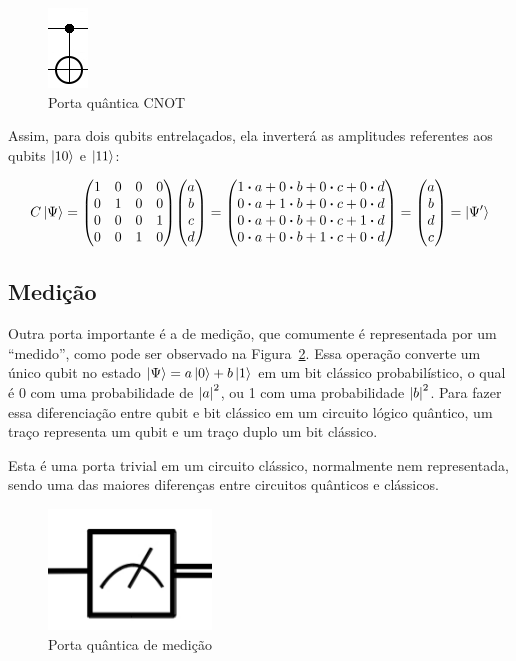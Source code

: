 \documentclass[a4paper, 12pt, oneside]{book}
\begin{document}
\begin{figure}[H]
\centering
\includegraphics[scale=0.80]{cnot.png}
\caption{Porta quântica CNOT}
\label{fig:CNOT}
\end{figure}

Assim, para dois qubits entrelaçados, ela inverterá as amplitudes referentes aos qubits $\ket{10}$ e $\ket{11}$:

\begin{equation}\label{eqFullCNOT}
C\ket{\Psi} = \mqty(1&0&0&0\\0&1&0&0\\0&0&0&1\\0&0&1&0)\mqty(a\\b\\c\\d) = 
\mqty(1 \vdot a+0 \vdot b +0 \vdot c +0 \vdot d \\
	  0 \vdot a+1 \vdot b +0 \vdot c +0 \vdot d \\
	  0 \vdot a+0 \vdot b +0 \vdot c +1 \vdot d \\
	  0 \vdot a+0 \vdot b +1 \vdot c +0 \vdot d ) 
= \mqty(a\\b\\d\\c) = \ket{\Psi'}
\end{equation}

\subsection{Medição} \label{sec:medicao}
Outra porta importante é a de medição, que comumente é representada por um ``medido'', como pode ser observado na Figura~\ref{fig:medicao}. Essa operação converte um único qubit no estado $\ket{\Psi}=a\ket{0}+b\ket{1}$ em um bit clássico probabilístico, o qual é 0 com uma probabilidade de $\abs{a}^2$, ou 1 com uma probabilidade $\abs{b}^2$. Para fazer essa diferenciação entre qubit e bit clássico em um circuito lógico quântico, um traço representa um qubit e um traço duplo um bit clássico.

Esta é uma porta trivial em um circuito clássico, normalmente nem representada, sendo uma das maiores diferenças entre circuitos quânticos e clássicos.

\begin{figure}[H]
\centering
\includegraphics[scale=0.40]{medicao.png}
\caption{Porta quântica de medição}
\label{fig:medicao}
\end{figure}
\end{document}
